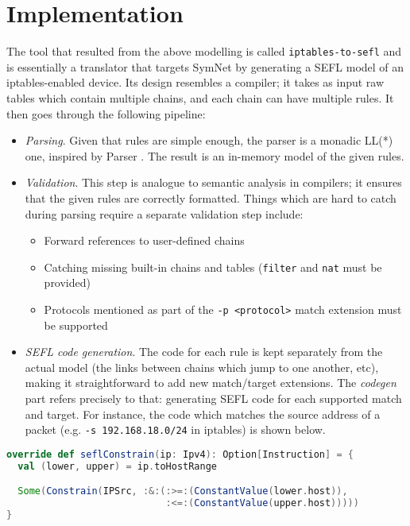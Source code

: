 \documentclass[twoside, 11pt, a4paper]{article}
\begin{document}
\section{Implementation}
The tool that resulted from the above modelling is called
\texttt{iptables-to-sefl} \cite{github-repo} and is essentially a translator
that targets SymNet by generating a SEFL model of an iptables-enabled device.
Its design resembles a compiler; it takes as input raw tables which contain
multiple chains, and each chain can have multiple rules.  It then goes through
the following pipeline:

\begin{itemize}
  \item \emph{Parsing}.  Given that rules are simple enough, the parser is a
    monadic LL(*) one, inspired by Parser \cite{leijen2002parsec}.  The result
    is an in-memory model of the given rules.
  \item \emph{Validation}.  This step is analogue to semantic analysis in
    compilers; it ensures that the given rules are correctly formatted.  Things
    which are hard to catch during parsing require a separate validation step
    include:
    \begin{itemize}
      \item Forward references to user-defined chains
      \item Catching missing built-in chains and tables (\texttt{filter} and
        \texttt{nat} must be provided)
      \item Protocols mentioned as part of the \texttt{-p <protocol>} match
        extension must be supported
    \end{itemize}
  \item \emph{SEFL code generation}.  The code for each rule is kept separately
    from the actual model (the links between chains which jump to one another,
    etc), making it straightforward to add new match/target extensions.  The
    \emph{codegen} part refers precisely to that: generating SEFL code for each
    supported match and target.  For instance, the code which matches the
    source address of a packet (e.g. \texttt{-s 192.168.18.0/24} in iptables)
    is shown below.
\end{itemize}

\begin{lstlisting}[language=scala,label={codegen}]
override def seflConstrain(ip: Ipv4): Option[Instruction] = {
  val (lower, upper) = ip.toHostRange

  Some(Constrain(IPSrc, :&:(:>=:(ConstantValue(lower.host)),
                            :<=:(ConstantValue(upper.host)))))
}
\end{lstlisting}
\end{document}
